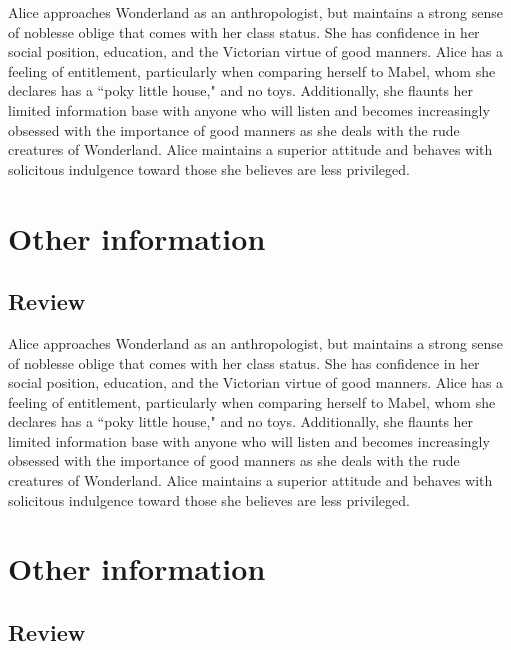 \documentclass[a4paper]{twentysecondcv} %
\begin{document}
Alice approaches Wonderland as an anthropologist, but maintains a strong sense of noblesse oblige that comes with her class status. She has confidence in her social position, education, and the Victorian virtue of good manners. Alice has a feeling of entitlement, particularly when comparing herself to Mabel, whom she declares has a ``poky little house," and no toys. Additionally, she flaunts her limited information base with anyone who will listen and becomes increasingly obsessed with the importance of good manners as she deals with the rude creatures of Wonderland. Alice maintains a superior attitude and behaves with solicitous indulgence toward those she believes are less privileged.


\newpage %

\makeprofile %

\section{Other information}

\subsection{Review}

Alice approaches Wonderland as an anthropologist, but maintains a strong sense of noblesse oblige that comes with her class status. She has confidence in her social position, education, and the Victorian virtue of good manners. Alice has a feeling of entitlement, particularly when comparing herself to Mabel, whom she declares has a ``poky little house," and no toys. Additionally, she flaunts her limited information base with anyone who will listen and becomes increasingly obsessed with the importance of good manners as she deals with the rude creatures of Wonderland. Alice maintains a superior attitude and behaves with solicitous indulgence toward those she believes are less privileged.

\section{Other information}

\subsection{Review}
\end{document}
